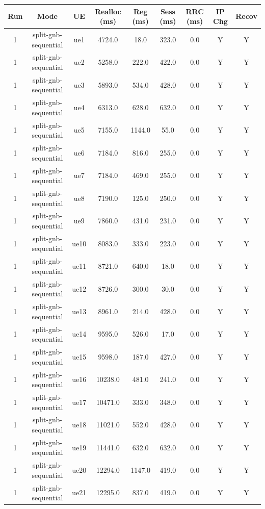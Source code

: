 \begin{table}[ht]
\centering
\begin{tabular}{|c|c|c|c|c|c|c|c|c|}
\hline
Run & Mode & UE & Realloc (ms) & Reg (ms) & Sess (ms) & RRC (ms) & IP Chg & Recov \\
\hline
1 & split-gnb-sequential & ue1 & 4724.0 & 18.0 & 323.0 & 0.0 & Y & Y \\
1 & split-gnb-sequential & ue2 & 5258.0 & 222.0 & 422.0 & 0.0 & Y & Y \\
1 & split-gnb-sequential & ue3 & 5893.0 & 534.0 & 428.0 & 0.0 & Y & Y \\
1 & split-gnb-sequential & ue4 & 6313.0 & 628.0 & 632.0 & 0.0 & Y & Y \\
1 & split-gnb-sequential & ue5 & 7155.0 & 1144.0 & 55.0 & 0.0 & Y & Y \\
1 & split-gnb-sequential & ue6 & 7184.0 & 816.0 & 255.0 & 0.0 & Y & Y \\
1 & split-gnb-sequential & ue7 & 7184.0 & 469.0 & 255.0 & 0.0 & Y & Y \\
1 & split-gnb-sequential & ue8 & 7190.0 & 125.0 & 250.0 & 0.0 & Y & Y \\
1 & split-gnb-sequential & ue9 & 7860.0 & 431.0 & 231.0 & 0.0 & Y & Y \\
1 & split-gnb-sequential & ue10 & 8083.0 & 333.0 & 223.0 & 0.0 & Y & Y \\
1 & split-gnb-sequential & ue11 & 8721.0 & 640.0 & 18.0 & 0.0 & Y & Y \\
1 & split-gnb-sequential & ue12 & 8726.0 & 300.0 & 30.0 & 0.0 & Y & Y \\
1 & split-gnb-sequential & ue13 & 8961.0 & 214.0 & 428.0 & 0.0 & Y & Y \\
1 & split-gnb-sequential & ue14 & 9595.0 & 526.0 & 17.0 & 0.0 & Y & Y \\
1 & split-gnb-sequential & ue15 & 9598.0 & 187.0 & 427.0 & 0.0 & Y & Y \\
1 & split-gnb-sequential & ue16 & 10238.0 & 481.0 & 241.0 & 0.0 & Y & Y \\
1 & split-gnb-sequential & ue17 & 10471.0 & 333.0 & 348.0 & 0.0 & Y & Y \\
1 & split-gnb-sequential & ue18 & 11021.0 & 552.0 & 428.0 & 0.0 & Y & Y \\
1 & split-gnb-sequential & ue19 & 11441.0 & 632.0 & 632.0 & 0.0 & Y & Y \\
1 & split-gnb-sequential & ue20 & 12294.0 & 1147.0 & 419.0 & 0.0 & Y & Y \\
1 & split-gnb-sequential & ue21 & 12295.0 & 837.0 & 419.0 & 0.0 & Y & Y \\

\end{tabular}
\end{table}
